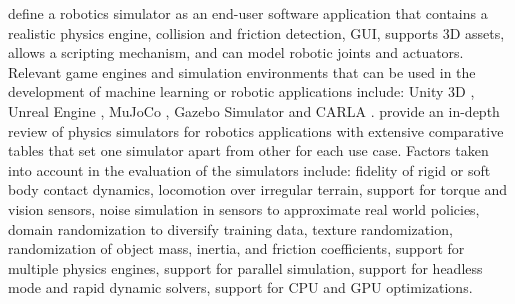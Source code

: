 \textcite{collins2021review} define a robotics simulator as an end-user software application that contains a realistic physics engine, collision and friction detection, GUI, supports 3D assets, allows a scripting mechanism, and can model robotic joints and actuators. Relevant game engines and simulation environments that can be used in the development of machine learning or robotic applications include: Unity 3D \cite{unity2021}, Unreal Engine \cite{unreal5_2021}, MuJoCo \cite{mujoco}, Gazebo Simulator \cite{osrf2021gazebosim} and CARLA \cite{Dosovitskiy17}.
\textcite{collins2021review} provide an in-depth review of physics simulators for robotics applications with extensive comparative tables that set one simulator apart from other for each use case. Factors taken into account in the evaluation of the simulators include: fidelity of rigid or soft body contact dynamics, locomotion over irregular terrain, support for torque and vision sensors, noise simulation in sensors to approximate real world policies, domain randomization to diversify training data, texture randomization, randomization of object mass, inertia, and friction coefficients, support for multiple physics engines, support for parallel simulation, support for headless mode and rapid dynamic solvers, support for CPU and GPU optimizations.

